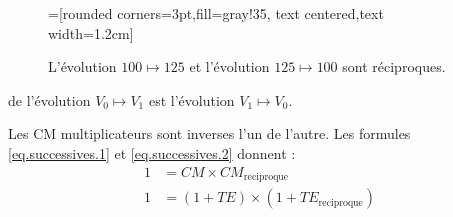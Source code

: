 \documentclass[main.tex]{subfiles}
\begin{document}
\begin{figure}[h]
	=[rounded corners=3pt,fill=gray!35, text centered,text width=1.2cm]
	\caption{L'évolution $100\mapsto 125$ et l'évolution $125\mapsto 100$ sont réciproques.}
\end{figure}
\begin{definition} de l'évolution $V_0\mapsto V_1$ est l'évolution $V_1\mapsto V_0$. 
	
	Les CM multiplicateurs sont inverses l'un de l'autre. 	Les formules \ref{eq.successives.1} et  \ref{eq.successives.2} donnent  : 
	\begin{align}  
		1 &  = CM \times CM_\text{reciproque} \\
		1 &  = (1+TE ) \times (1+TE_\text{reciproque}) 
	\end{align}
\end{definition}
\newpage 
\end{document}
